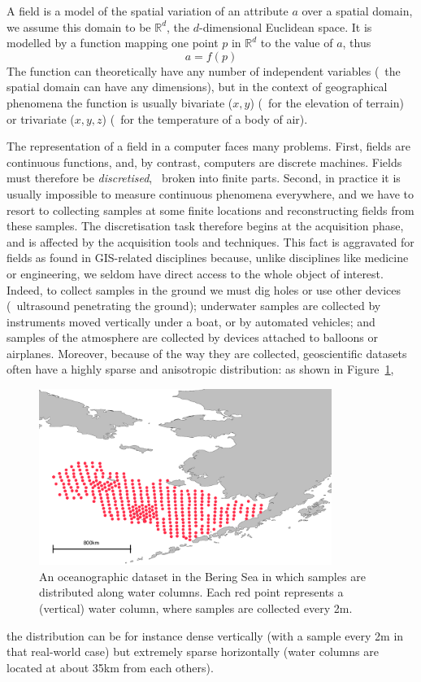 A field is a model of the spatial variation of an attribute $a$ over a spatial domain, we assume this domain to be $\mathbb{R}^d$, the $d$-dimensional Euclidean space.
It is modelled by a function mapping one point $p$ in $\mathbb{R}^d$ to the value of $a$, thus 
\[
  a = f(p)
\]
The function can theoretically have any number of independent variables (\ie\ the spatial domain can have any dimensions), but in the context of geographical phenomena the function is usually bivariate ($x,y$) (\eg\ for the elevation of terrain) or trivariate ($x,y,z$) (\eg\ for the temperature of a body of air).

%

The representation of a field in a computer faces many problems. 
First, fields are continuous functions, and, by contrast, computers are discrete machines. 
Fields must therefore be \emph{discretised}, \ie\ broken into finite parts.
Second, in practice it is usually impossible to measure continuous phenomena everywhere, and we have to resort to collecting samples at some finite locations and reconstructing fields from these samples.
The discretisation task therefore begins at the acquisition phase, and is affected by the acquisition tools and techniques.
This fact is aggravated for fields as found in GIS-related disciplines because, unlike disciplines like medicine or engineering, we seldom have direct access to the whole object of interest.
Indeed, to collect samples in the ground we must dig holes or use other devices (\eg\ ultrasound penetrating the ground); underwater samples are collected by instruments moved vertically under a boat, or by automated vehicles; and samples of the atmosphere are collected by devices attached to balloons or airplanes. 
Moreover, because of the way they are collected, geoscientific datasets often have a highly sparse and anisotropic distribution: as shown in Figure~\ref{fig:watercolumns}, 
\begin{figure}
  \centering
  \includegraphics[width=0.85\textwidth]{figs/watercolumns}
  \caption{An oceanographic dataset in the Bering Sea in which samples are distributed along water columns. Each red point represents a (vertical) water column, where samples are collected every 2m.}%
\label{fig:watercolumns}
\end{figure}
the distribution can be for instance dense vertically (with a sample every 2m in that real-world case) but extremely sparse horizontally (water columns are located at about 35km from each others).


